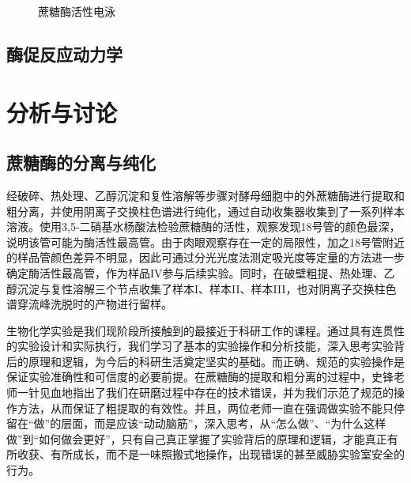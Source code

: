 \begin{figure}
    \caption{蔗糖酶活性电泳}
    \label{fig:WB}
\end{figure}        
\subsection{酶促反应动力学}


\section{分析与讨论}

\subsection{蔗糖酶的分离与纯化}
经破碎、热处理、乙醇沉淀和复性溶解等步骤对酵母细胞中的外蔗糖酶进行提取和粗分离，并使用阴离子交换柱色谱进行纯化，通过自动收集器收集到了一系列样本溶液。使用3,5-二硝基水杨酸法检验蔗糖酶的活性，观察发现18号管的颜色最深，说明该管可能为酶活性最高管。由于肉眼观察存在一定的局限性，加之18号管附近的样品管颜色差异不明显，因此可通过分光光度法测定吸光度等定量的方法进一步确定酶活性最高管，作为样品IV参与后续实验。同时，在破壁粗提、热处理、乙醇沉淀与复性溶解三个节点收集了样本I、样本II、样本III，也对阴离子交换柱色谱穿流峰洗脱时的产物进行留样。

生物化学实验是我们现阶段所接触到的最接近于科研工作的课程。通过具有连贯性的实验设计和实际执行，我们学习了基本的实验操作和分析技能，深入思考实验背后的原理和逻辑，为今后的科研生活奠定坚实的基础。而正确、规范的实验操作是保证实验准确性和可信度的必要前提。在蔗糖酶的提取和粗分离的过程中，史锋老师一针见血地指出了我们在研磨过程中存在的技术错误，并为我们示范了规范的操作方法，从而保证了粗提取的有效性。并且，两位老师一直在强调做实验不能只停留在“做”的层面，而是应该“动动脑筋”，深入思考，从“怎么做”、“为什么这样做”到“如何做会更好”，只有自己真正掌握了实验背后的原理和逻辑，才能真正有所收获、有所成长，而不是一味照搬式地操作，出现错误的甚至威胁实验室安全的行为。

